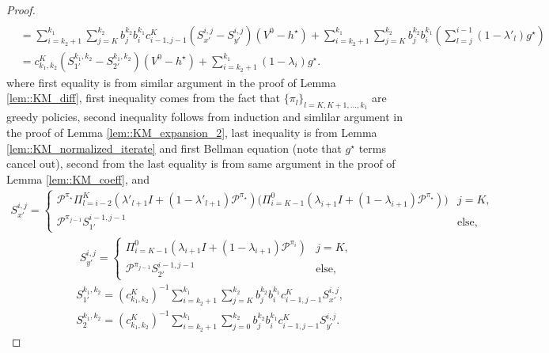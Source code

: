 \documentclass{article} %
\newcommand{\cP}{\mathcal{P}}
\newcommand*{\para}[1]{\left({#1}\right)}
\begin{document}
\begin{proof}
\begin{align*}
        \\& =\sum^{k_1}_{i=k_2+1} \sum^{k_2}_{j=K} b^{k_2}_j  b^{k_1}_i c^K_{i-1,j-1}(S^{i,j}_{x'}-S^{i,j}_{y'}) (V^0-h^{\star}) +\sum^{k_1}_{i=k_2+1} \sum^{k_2}_{j=K} b^{k_2}_j  b^{k_1}_i \para{\sum^{i-1}_{l=j} (1-\lambda'_{l})g^{\star}}
        \\& = c^K_{k_1,k_2}(S^{k_1,k_2}_{1'}-S^{k_1,k_2}_{2'}) (V^0-h^{\star})+ \sum^{k_1}_{i=k_2+1} (1-\lambda_{i})g^{\star}.
    \end{align*}
    where first equality is from similar argument in the proof of Lemma \ref{lem::KM_diff}, first inequality comes from the fact that $\{\pi_l\}_{l=K,K+1,\dots,k_1}$ are greedy policies, second inequality follows from induction and simlilar argument in the proof of Lemma \ref{lem::KM_expansion_2}, last inequality is from Lemma \ref{lem::KM_normalized_iterate} and first Bellman equation
    (note that $g^{\star}$ terms cancel out), second from the last equality is from same argument in the proof of Lemma \ref{lem::KM_coeff}, and
    \begin{align*}
     S^{i,j}_{x'}=\left\{
    \begin{array}{ll}
    \cP^{\pi_{\star}}\Pi^{K}_{l=i-2}(\lambda'_{l+1}I+(1-\lambda'_{l+1}) \cP^{\pi_{\star}})(\Pi^{0}_{i=K-1}(\lambda_{i+1}I+(1-\lambda_{i+1}) \cP^{\pi_{\star}})\bigg) & j=K,\\
    \cP^{\pi_{j-1}}S^{i-1,j-1}_{1'} & \text{else},
    \end{array}\right. 
    \end{align*}
    \begin{align*}
        \qquad      
    S^{i,j}_{y'}=\left\{
    \begin{array}{ll}
    \Pi^{0}_{i=K-1}(\lambda_{i+1}I+(1-\lambda_{i+1}) \cP^{\pi_i}) & j=K,\\
    \cP^{\pi_{j-1}}S^{i-1,j-1}_{2'} & \text{else},
    \end{array}\right. 
    \end{align*}
\begin{align*}
    &S^{k_1,k_2}_{1'} =(c^K_{k_1,k_2})^{-1}\sum^{k_1}_{i=k_2+1} \sum^{k_2}_{j=K} b^{k_2}_j  b^{k_1}_i c^K_{i-1,j-1}S^{i,j}_{x'},
    \\& S^{k_1,k_2}_2 =(c^K_{k_1,k_2})^{-1}\sum^{k_1}_{i=k_2+1} \sum^{k_2}_{j=0} b^{k_2}_j  b^{k_1}_i c^K_{i-1,j-1}S^{i,j}_{y'}.
\end{align*}     
\end{proof}
\end{document}

